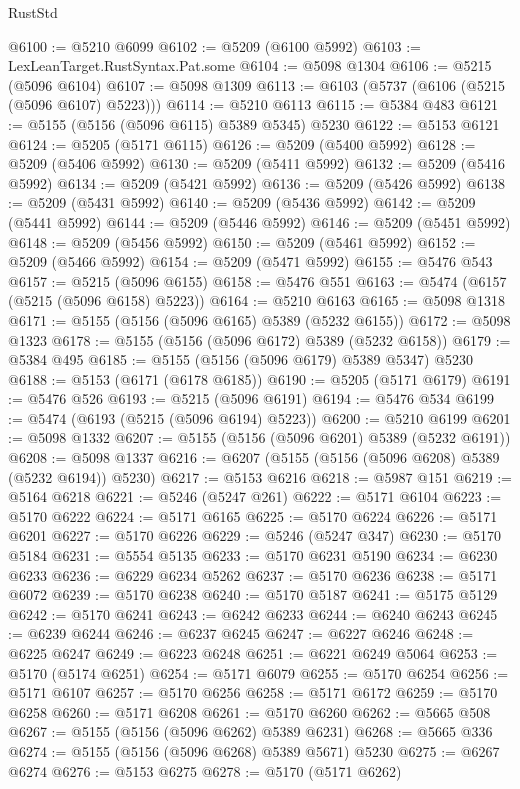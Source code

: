 \begin{lexlean}{RustStd}
\begin{coremodule}
@6100 := @5210 @6099
@6102 := @5209 (@6100 @5992)
@6103 := LexLeanTarget.RustSyntax.Pat.some
@6104 := @5098 @1304
@6106 := @5215 (@5096 @6104)
@6107 := @5098 @1309
@6113 := @6103 (@5737 (@6106 (@5215 (@5096 @6107) @5223)))
@6114 := @5210 @6113
@6115 := @5384 @483
@6121 := @5155 (@5156 (@5096 @6115) @5389 @5345) @5230
@6122 := @5153 @6121
@6124 := @5205 (@5171 @6115)
@6126 := @5209 (@5400 @5992)
@6128 := @5209 (@5406 @5992)
@6130 := @5209 (@5411 @5992)
@6132 := @5209 (@5416 @5992)
@6134 := @5209 (@5421 @5992)
@6136 := @5209 (@5426 @5992)
@6138 := @5209 (@5431 @5992)
@6140 := @5209 (@5436 @5992)
@6142 := @5209 (@5441 @5992)
@6144 := @5209 (@5446 @5992)
@6146 := @5209 (@5451 @5992)
@6148 := @5209 (@5456 @5992)
@6150 := @5209 (@5461 @5992)
@6152 := @5209 (@5466 @5992)
@6154 := @5209 (@5471 @5992)
@6155 := @5476 @543
@6157 := @5215 (@5096 @6155)
@6158 := @5476 @551
@6163 := @5474 (@6157 (@5215 (@5096 @6158) @5223))
@6164 := @5210 @6163
@6165 := @5098 @1318
@6171 := @5155 (@5156 (@5096 @6165) @5389 (@5232 @6155))
@6172 := @5098 @1323
@6178 := @5155 (@5156 (@5096 @6172) @5389 (@5232 @6158))
@6179 := @5384 @495
@6185 := @5155 (@5156 (@5096 @6179) @5389 @5347) @5230
@6188 := @5153 (@6171 (@6178 @6185))
@6190 := @5205 (@5171 @6179)
@6191 := @5476 @526
@6193 := @5215 (@5096 @6191)
@6194 := @5476 @534
@6199 := @5474 (@6193 (@5215 (@5096 @6194) @5223))
@6200 := @5210 @6199
@6201 := @5098 @1332
@6207 := @5155 (@5156 (@5096 @6201) @5389 (@5232 @6191))
@6208 := @5098 @1337
@6216 := @6207 (@5155 (@5156 (@5096 @6208) @5389 (@5232 @6194)) @5230)
@6217 := @5153 @6216
@6218 := @5987 @151
@6219 := @5164 @6218
@6221 := @5246 (@5247 @261)
@6222 := @5171 @6104
@6223 := @5170 @6222
@6224 := @5171 @6165
@6225 := @5170 @6224
@6226 := @5171 @6201
@6227 := @5170 @6226
@6229 := @5246 (@5247 @347)
@6230 := @5170 @5184
@6231 := @5554 @5135
@6233 := @5170 @6231 @5190
@6234 := @6230 @6233
@6236 := @6229 @6234 @5262
@6237 := @5170 @6236
@6238 := @5171 @6072
@6239 := @5170 @6238
@6240 := @5170 @5187
@6241 := @5175 @5129
@6242 := @5170 @6241
@6243 := @6242 @6233
@6244 := @6240 @6243
@6245 := @6239 @6244
@6246 := @6237 @6245
@6247 := @6227 @6246
@6248 := @6225 @6247
@6249 := @6223 @6248
@6251 := @6221 @6249 @5064
@6253 := @5170 (@5174 @6251)
@6254 := @5171 @6079
@6255 := @5170 @6254
@6256 := @5171 @6107
@6257 := @5170 @6256
@6258 := @5171 @6172
@6259 := @5170 @6258
@6260 := @5171 @6208
@6261 := @5170 @6260
@6262 := @5665 @508
@6267 := @5155 (@5156 (@5096 @6262) @5389 @6231)
@6268 := @5665 @336
@6274 := @5155 (@5156 (@5096 @6268) @5389 @5671) @5230
@6275 := @6267 @6274
@6276 := @5153 @6275
@6278 := @5170 (@5171 @6262)

\end{coremodule}
\end{lexlean}

